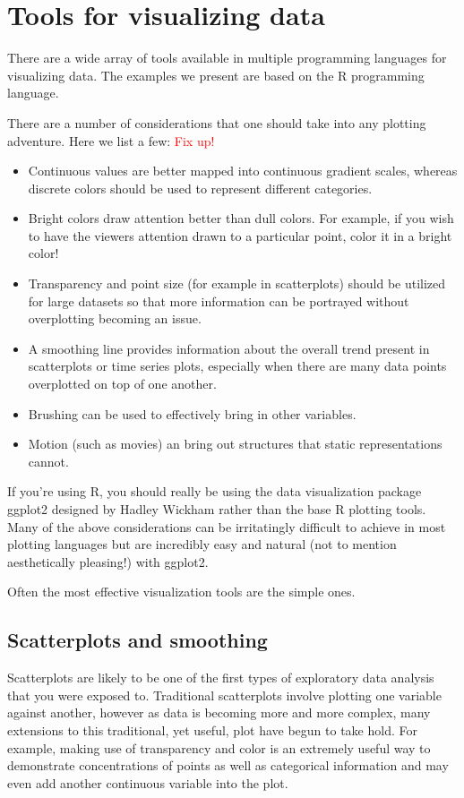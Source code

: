 \section{Tools for visualizing data}

There are a wide array of tools available in multiple programming languages for visualizing data. The examples we present are based on the R programming language. 

There are a number of considerations that one should take into any plotting adventure. Here we list a few: \textcolor{red}{Fix up!}

\begin{itemize}
\item Continuous values are better mapped into continuous gradient scales, whereas discrete colors should be used to represent different categories.
\item Bright colors draw attention better than dull colors. For example, if you wish to have the viewers attention drawn to a particular point, color it in a bright color!
\item Transparency and point size (for example in scatterplots) should be utilized for large datasets so that more information can be portrayed without overplotting becoming an issue.
\item A smoothing line provides information about the overall trend present in scatterplots or time series plots, especially when there are many data points overplotted on top of one another.
\item Brushing can be used to effectively bring in other variables.
\item Motion (such as movies) an bring out structures that static representations cannot.
\end{itemize}

If you're using R, you should really be using the data visualization package ggplot2 designed by Hadley Wickham rather than the base R plotting tools. Many of the above considerations can be irritatingly difficult to achieve in most plotting languages but are incredibly easy and natural (not to mention aesthetically pleasing!) with ggplot2. 

Often the most effective visualization tools are the simple ones.

\subsection*{Scatterplots and smoothing}

Scatterplots are likely to be one of the first types of exploratory data analysis that you were exposed to. Traditional scatterplots involve plotting one variable against another, however as data is becoming more and more complex, many extensions to this traditional, yet useful, plot have begun to take hold. For example, making use of transparency and color is an extremely useful way to demonstrate concentrations of points as well as categorical information and may even add another continuous variable into the plot.

